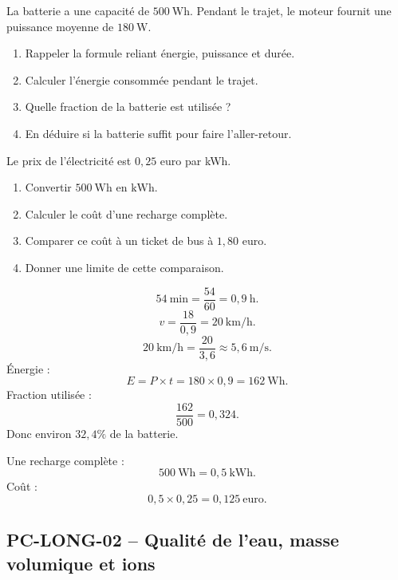 \begin{exercice}
La batterie a une capacité de $500\ \mathrm{Wh}$. Pendant le trajet, le moteur fournit une puissance moyenne de $180\ \mathrm{W}$.

\begin{enumerate}
  \item Rappeler la formule reliant énergie, puissance et durée.
  \item Calculer l'énergie consommée pendant le trajet.
  \item Quelle fraction de la batterie est utilisée ?
  \item En déduire si la batterie suffit pour faire l'aller-retour.
\end{enumerate}
\end{exercice}

\begin{exercice}
Le prix de l'électricité est $0{,}25$ euro par kWh.

\begin{enumerate}
  \item Convertir $500\ \mathrm{Wh}$ en $\mathrm{kWh}$.
  \item Calculer le coût d'une recharge complète.
  \item Comparer ce coût à un ticket de bus à $1{,}80$ euro.
  \item Donner une limite de cette comparaison.
\end{enumerate}
\end{exercice}

\begin{correction}
\[
54\ \mathrm{min}=\frac{54}{60}=0{,}9\ \mathrm{h}.
\]
\[
v=\frac{18}{0{,}9}=20\ \mathrm{km/h}.
\]
\[
20\ \mathrm{km/h}=\frac{20}{3{,}6}\approx5{,}6\ \mathrm{m/s}.
\]
Énergie :
\[
E=P\times t=180\times0{,}9=162\ \mathrm{Wh}.
\]
Fraction utilisée :
\[
\frac{162}{500}=0{,}324.
\]
Donc environ $32{,}4\%$ de la batterie.

Une recharge complète :
\[
500\ \mathrm{Wh}=0{,}5\ \mathrm{kWh}.
\]
Coût :
\[
0{,}5\times0{,}25=0{,}125\ \text{euro}.
\]
\end{correction}

\newpage

\subsection{PC-LONG-02 -- Qualité de l'eau, masse volumique et ions}

